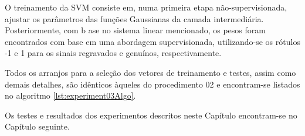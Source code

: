 		\par O treinamento da SVM consiste em, numa primeira etapa não-supervisionada, ajustar os parâmetros das funções Gaussianas da camada intermediária. Posteriormente, com b ase no sistema linear mencionado, os pesos foram encontrados com base em uma abordagem supervisionada, utilizando-se os rótulos -1 e 1 para os sinais regravados e genuínos, respectivamente.    
		
		\par Todos os arranjos para a seleção dos vetores de treinamento e testes, assim como demais detalhes,   são idênticos àqueles do procedimento 02 e encontram-se listados no algoritmo \ref{lst:experiment03Algo}. 
		
		

        \par Os testes e resultados dos experimentos descritos neste Capítulo encontram-se no Capítulo seguinte. 